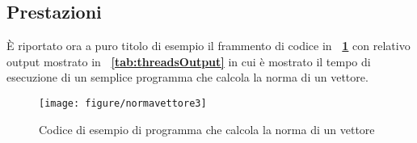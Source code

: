 {\subsection{Prestazioni}
\`E riportato ora a puro titolo di esempio il frammento di codice in \textbf{\figurename~\ref{fig:normaVettore}} con relativo output mostrato in \textbf{\tablename~\ref{tab:threadsOutput}} in cui \`e mostrato il tempo di esecuzione di un semplice programma che calcola la norma di un vettore.
\begin{figure}[!htb]
	\begin{center}
		\texttt{[image: figure/normavettore3]}
	\end{center}
	\caption{Codice di esempio di programma che calcola la norma di un vettore \label{fig:normaVettore}}
\end{figure}

}

